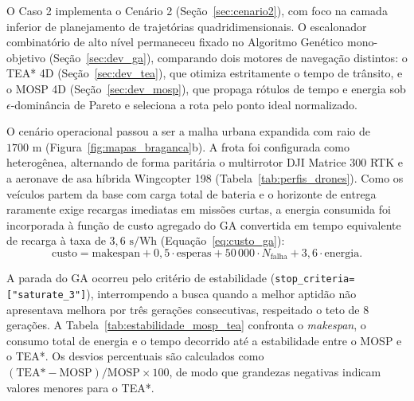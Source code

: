 O Caso 2 implementa o Cenário 2 (Seção~\ref{sec:cenario2}), com foco na camada inferior de planejamento de trajetórias quadridimensionais. O escalonador combinatório de alto nível permaneceu fixado no Algoritmo Genético mono-objetivo (Seção~\ref{sec:dev_ga}), comparando dois motores de navegação distintos: o TEA* 4D (Seção~\ref{sec:dev_tea}), que otimiza estritamente o tempo de trânsito, e o MOSP 4D (Seção~\ref{sec:dev_mosp}), que propaga rótulos de tempo e energia sob $\epsilon$-dominância de Pareto e seleciona a rota pelo ponto ideal normalizado.

O cenário operacional passou a ser a malha urbana expandida com raio de $1700\text{ m}$ (Figura~\ref{fig:mapas_braganca}b). A frota foi configurada como heterogênea, alternando de forma paritária o multirrotor DJI Matrice 300 RTK e a aeronave de asa híbrida Wingcopter 198 (Tabela~\ref{tab:perfis_drones}). Como os veículos partem da base com carga total de bateria e o horizonte de entrega raramente exige recargas imediatas em missões curtas, a energia consumida foi incorporada à função de custo agregado do GA convertida em tempo equivalente de recarga à taxa de $3{,}6\text{ s/Wh}$ (Equação~\eqref{eq:custo_ga}):
\begin{equation}\label{eq:custo_caso2}
\text{custo} = \text{makespan} + 0{,}5 \cdot \text{esperas} + 50\,000 \cdot N_{\text{falha}} + 3{,}6 \cdot \text{energia}.
\end{equation}

A parada do GA ocorreu pelo critério de estabilidade (\texttt{stop\_criteria=["saturate\_3"]}), interrompendo a busca quando a melhor aptidão não apresentava melhora por três gerações consecutivas, respeitado o teto de 8 gerações. A Tabela~\ref{tab:estabilidade_mosp_tea} confronta o \textit{makespan}, o consumo total de energia e o tempo decorrido até a estabilidade entre o MOSP e o TEA*. Os desvios percentuais são calculados como $(\text{TEA*} - \text{MOSP}) / \text{MOSP} \times 100$, de modo que grandezas negativas indicam valores menores para o TEA*.


